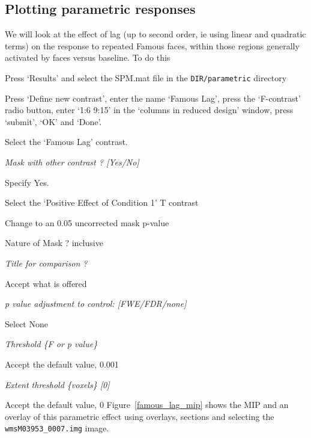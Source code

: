 \subsection{Plotting parametric responses}

We will look at the effect of lag (up to second order, ie using linear and quadratic terms) on the response to repeated Famous faces, within those regions generally activated by faces versus baseline. To do this
\bi
\item{Press `Results' and select the SPM.mat file in the 
\verb!DIR/parametric! directory}
\item{Press `Define new contrast', enter the name `Famous Lag', press the `F-contrast' radio button, enter `1:6 9:15' in the `columns in reduced design' window, press `submit', `OK' and `Done'.}
\item{Select the `Famous Lag' contrast.}
\item{\em Mask with other contrast ? [Yes/No]}
\item{Specify Yes.}
\item{Select the `Positive Effect of Condition 1' T contrast}
\item{Change to an 0.05 uncorrected mask p-value}
\item{Nature of Mask ? inclusive}
\item{\em Title for comparison ?}
\item{Accept what is offered}
\item{\em p value adjustment to control: [FWE/FDR/none]}
\item{Select None}
\item{\em Threshold \{F or p value\}}
\item{Accept the default value, 0.001}
\item{\em Extent threshold \{voxels\} [0]}
\item{Accept the default value, 0}
\ei
Figure~\ref{famous_lag_mip} shows the MIP and an
overlay of this parametric effect using overlays, sections and selecting the \verb!wmsM03953_0007.img! image. 
